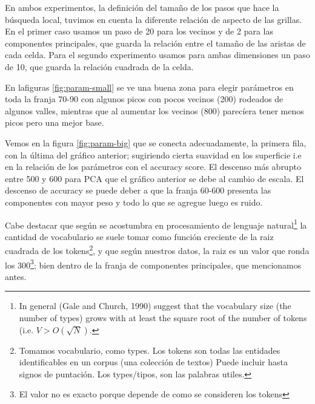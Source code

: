 En ambos experimentos, la definición del tamaño de los pasos que hace
la búsqueda local, tuvimos en cuenta la diferente relación de aspecto
de las grillas. En el primer caso usamos un paso de 20 para los
vecinos y de 2 para las componentes principales, que guarda la
relación entre el tamaño de las aristas de cada celda. Para el segundo
experimento usamos para ambas dimensiones un paso de 10, que guarda la
relación cuadrada de la celda.

En lafiguras \ref{fig:param-small} se ve una buena zona para elegir parámetros en toda la franja 70-90 con algunos picos con pocos vecinos (200) rodeados de algunos valles, mientras que al aumentar los vecinos (800) parecíera tener menos picos pero una mejor base.

Vemos en la figura \ref{fig:param-big} que se conecta adecuadamente,
la primera fila, con la última del gráfico anterior; sugiriendo cierta
suavidad en los superficie i.e en la relación de los parámetros con el accuracy score. El descenso más abrupto entre 500 y 600 para PCA que el
gráfico anterior se debe al cambio de escala. El descenso de
accuracy se puede deber a que la franja 60-600 presenta las componentes con mayor peso y todo lo que se agregue luego es ruido.

Cabe destacar que según se acostumbra en procesamiento de
lenguaje\cite{LP} natural\footnote{In general (Gale and Church, 1990)
  suggest that the vocabulary size (the number of types) grows with at
  least the square root of the number of tokens (i.e.
  $V > O(\sqrt{N})$.} la cantidad de vocabulario se suele tomar como
función creciente de la raiz cuadrada de los tokens\footnote{Tomamos
  vocabulario, como types. Los tokens son todas las entidades
  identificables en un corpus (una colección de textos) Puede incluir
  hasta signos de puntación. Los types/tipos, son las palabras
  utiles.}, y que según nuestros datos, la raiz es un valor que ronda
los 300\footnote{El valor no es exacto porque depende de como se
  consideren los tokens}; bien dentro de la franja de componentes
principales, que mencionamos antes.


